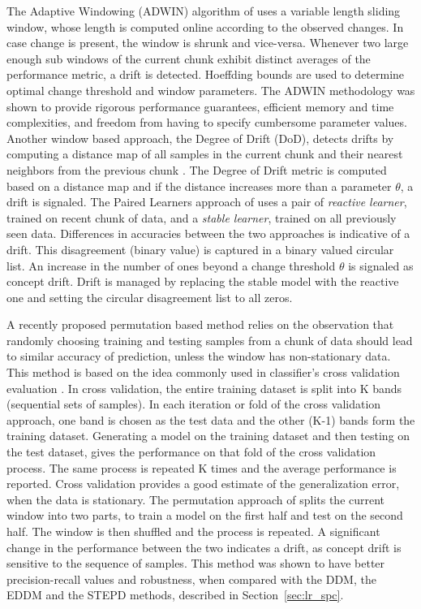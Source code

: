 \documentclass[authoryear,3p,times,twocolumn]{elsarticle}
\begin{document}
The Adaptive Windowing (ADWIN) algorithm of \citep{bifet2007learning} uses a variable length sliding window, whose length is computed online according to the observed changes. In case change is present, the window is shrunk and vice-versa. Whenever two large enough sub windows of the current chunk exhibit distinct averages of the performance metric, a drift is detected. Hoeffding bounds \citep{schmidt1995chernoff} are used to determine optimal change threshold and window parameters. The ADWIN methodology was shown to provide rigorous performance guarantees, efficient memory and time complexities, and freedom from having to specify cumbersome parameter values. Another window based approach, the Degree of Drift (DoD), detects drifts by computing a distance map of all samples in the current chunk and their nearest neighbors from the previous chunk \citep{sobhani2011new}. The Degree of Drift metric is computed based on a distance map and if the distance increases more than a parameter $\theta$, a drift is signaled. The Paired Learners approach of  \citep{bach2008paired} uses a pair of \textit{reactive learner}, trained on recent chunk of data, and a\textit{ stable learner}, trained on all previously seen data. Differences in accuracies between the two approaches is indicative of a drift. This disagreement (binary value) is captured in a binary valued circular list. An increase in the number of ones beyond a change threshold $\theta$ is signaled as concept drift. Drift is managed by replacing the stable model with the reactive one and setting the circular disagreement list to all zeros. 

A recently proposed permutation based method \citep{harel2014concept} relies on the observation that randomly choosing training and testing samples from a chunk of data should lead to similar accuracy of prediction, unless the window has non-stationary data. This method is based on the idea commonly used in classifier's cross validation evaluation \citep{kohavi1995study}. In cross validation, the entire training dataset is split into K bands (sequential sets of samples). In each iteration or fold of the cross validation approach, one band is chosen as the test data and the other (K-1) bands form the training dataset. Generating a model on the training dataset and then testing on the test dataset, gives the performance on that fold of the cross validation process. The same process is repeated K times and the average performance is reported. Cross validation provides a good estimate of the generalization error, when the data is stationary. The permutation approach of \citep{harel2014concept} splits the current window into two parts, to train a model on the first half and test on the second half. The window is then shuffled and the process is repeated. A significant change in the performance between the two indicates a drift, as concept drift is sensitive to the sequence of samples. This method was shown to have better precision-recall values and robustness, when compared with the DDM, the EDDM  and the STEPD methods, described in Section~\ref{sec:lr_spc}.
\end{document}
